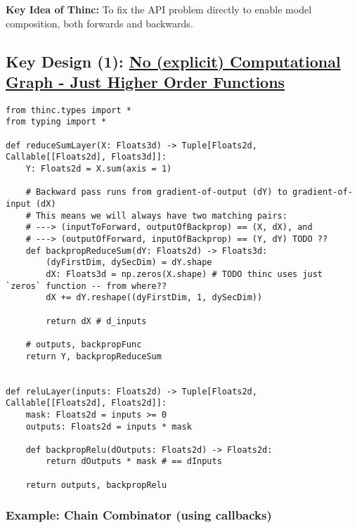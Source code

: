\documentclass[
]{article}
\begin{document}
\textbf{Key Idea of Thinc:} To fix the API problem directly to enable
model composition, both forwards and backwards.

\hypertarget{key-design-1-no-explicit-computational-graph---just-higher-order-functions}{%
\subsection{\texorpdfstring{Key Design (1):
\href{https://hyp.is/XMJRpk5FEeqjof-24zQhoA/thinc.ai/docs/concept}{No
(explicit) Computational Graph - Just Higher Order
Functions}}{Key Design (1): No (explicit) Computational Graph - Just Higher Order Functions}}\label{key-design-1-no-explicit-computational-graph---just-higher-order-functions}}

\begin{verbatim}
from thinc.types import *
from typing import *

def reduceSumLayer(X: Floats3d) -> Tuple[Floats2d, Callable[[Floats2d], Floats3d]]:
    Y: Floats2d = X.sum(axis = 1)

    # Backward pass runs from gradient-of-output (dY) to gradient-of-input (dX)
    # This means we will always have two matching pairs:
    # ---> (inputToForward, outputOfBackprop) == (X, dX), and
    # ---> (outputOfForward, inputOfBackprop) == (Y, dY) TODO ??
    def backpropReduceSum(dY: Floats2d) -> Floats3d:
        (dyFirstDim, dySecDim) = dY.shape
        dX: Floats3d = np.zeros(X.shape) # TODO thinc uses just `zeros` function -- from where??
        dX += dY.reshape((dyFirstDim, 1, dySecDim))

        return dX # d_inputs

    # outputs, backpropFunc
    return Y, backpropReduceSum


def reluLayer(inputs: Floats2d) -> Tuple[Floats2d, Callable[[Floats2d], Floats2d]]:
    mask: Floats2d = inputs >= 0
    outputs: Floats2d = inputs * mask

    def backpropRelu(dOutputs: Floats2d) -> Floats2d:
        return dOutputs * mask # == dInputs

    return outputs, backpropRelu
\end{verbatim}

\hypertarget{example-chain-combinator-using-callbacks}{%
\subsubsection{Example: Chain Combinator (using
callbacks)}\label{example-chain-combinator-using-callbacks}}
\end{document}
